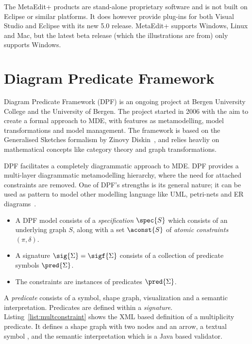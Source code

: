 The MetaEdit+ products are stand-alone proprietary software and is not built on Eclipse or similar platforms. It does however provide plug-ins for both Visual Studio and Eclipse with its new 5.0 release. MetaEdit+ supports Windows, Linux and Mac, but the latest beta release (which the illustrations are from) only supports Windows.

\section{Diagram Predicate Framework}\label{sec:dpf}
Diagram Predicate Framework (DPF) is an ongoing project at Bergen University College and the University of Bergen. The project started in 2006 with the aim to create a formal approach to MDE, with features as metamodelling, model transformations and model management. The framework is based on the Generalised Sketches formalism by Zinovy Diskin~\cite{DiskinKadish03}, and relies heavliy on mathematical concepts like category theory and graph transformations.

DPF facilitates a completely diagrammatic approach to MDE. DPF provides a multi-layer diagrammatic metamodelling hierarchy, where the need for attached constraints are removed. One of DPF's strengths is its general nature; it can be used as pattern to model other modelling language like UML, petri-nets and ER diagrams~\cite{RutleWolterL08TR367UIB}.

\begin{itemize}
  \item A DPF model consists of a \emph{specification $\spec{S}$} which consists of an underlying graph $S$, along with a set $\aconst{S}$ of \emph{atomic constraints $(\pi, \delta)$}.
  \item A signature $\sig{\Sigma} = \sigf{\Sigma}$ consists of a collection of predicate symbols $\pred{\Sigma}$.
  \item The constraints are instances of predicates $\pred{\Sigma}$.
\end{itemize}

A \emph{predicate} consists of a symbol, shape graph, visualization and a semantic interpretation. Predicates are defined within a \emph{signature}. Listing~\ref{list:multconstraint} shows the XML based definition of a multiplicity predicate. It defines a shape graph with two nodes and an arrow, a textual symbol \codeText{[mult(m,n)]}, and the semantic interpretation which is a Java based validator.

